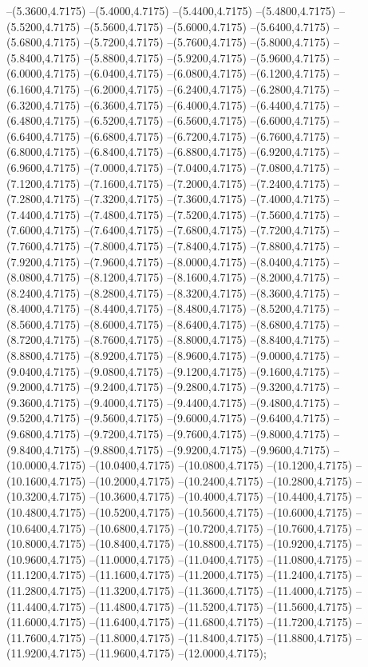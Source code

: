{	--(5.3600,4.7175)
	--(5.4000,4.7175)
	--(5.4400,4.7175)
	--(5.4800,4.7175)
	--(5.5200,4.7175)
	--(5.5600,4.7175)
	--(5.6000,4.7175)
	--(5.6400,4.7175)
	--(5.6800,4.7175)
	--(5.7200,4.7175)
	--(5.7600,4.7175)
	--(5.8000,4.7175)
	--(5.8400,4.7175)
	--(5.8800,4.7175)
	--(5.9200,4.7175)
	--(5.9600,4.7175)
	--(6.0000,4.7175)
	--(6.0400,4.7175)
	--(6.0800,4.7175)
	--(6.1200,4.7175)
	--(6.1600,4.7175)
	--(6.2000,4.7175)
	--(6.2400,4.7175)
	--(6.2800,4.7175)
	--(6.3200,4.7175)
	--(6.3600,4.7175)
	--(6.4000,4.7175)
	--(6.4400,4.7175)
	--(6.4800,4.7175)
	--(6.5200,4.7175)
	--(6.5600,4.7175)
	--(6.6000,4.7175)
	--(6.6400,4.7175)
	--(6.6800,4.7175)
	--(6.7200,4.7175)
	--(6.7600,4.7175)
	--(6.8000,4.7175)
	--(6.8400,4.7175)
	--(6.8800,4.7175)
	--(6.9200,4.7175)
	--(6.9600,4.7175)
	--(7.0000,4.7175)
	--(7.0400,4.7175)
	--(7.0800,4.7175)
	--(7.1200,4.7175)
	--(7.1600,4.7175)
	--(7.2000,4.7175)
	--(7.2400,4.7175)
	--(7.2800,4.7175)
	--(7.3200,4.7175)
	--(7.3600,4.7175)
	--(7.4000,4.7175)
	--(7.4400,4.7175)
	--(7.4800,4.7175)
	--(7.5200,4.7175)
	--(7.5600,4.7175)
	--(7.6000,4.7175)
	--(7.6400,4.7175)
	--(7.6800,4.7175)
	--(7.7200,4.7175)
	--(7.7600,4.7175)
	--(7.8000,4.7175)
	--(7.8400,4.7175)
	--(7.8800,4.7175)
	--(7.9200,4.7175)
	--(7.9600,4.7175)
	--(8.0000,4.7175)
	--(8.0400,4.7175)
	--(8.0800,4.7175)
	--(8.1200,4.7175)
	--(8.1600,4.7175)
	--(8.2000,4.7175)
	--(8.2400,4.7175)
	--(8.2800,4.7175)
	--(8.3200,4.7175)
	--(8.3600,4.7175)
	--(8.4000,4.7175)
	--(8.4400,4.7175)
	--(8.4800,4.7175)
	--(8.5200,4.7175)
	--(8.5600,4.7175)
	--(8.6000,4.7175)
	--(8.6400,4.7175)
	--(8.6800,4.7175)
	--(8.7200,4.7175)
	--(8.7600,4.7175)
	--(8.8000,4.7175)
	--(8.8400,4.7175)
	--(8.8800,4.7175)
	--(8.9200,4.7175)
	--(8.9600,4.7175)
	--(9.0000,4.7175)
	--(9.0400,4.7175)
	--(9.0800,4.7175)
	--(9.1200,4.7175)
	--(9.1600,4.7175)
	--(9.2000,4.7175)
	--(9.2400,4.7175)
	--(9.2800,4.7175)
	--(9.3200,4.7175)
	--(9.3600,4.7175)
	--(9.4000,4.7175)
	--(9.4400,4.7175)
	--(9.4800,4.7175)
	--(9.5200,4.7175)
	--(9.5600,4.7175)
	--(9.6000,4.7175)
	--(9.6400,4.7175)
	--(9.6800,4.7175)
	--(9.7200,4.7175)
	--(9.7600,4.7175)
	--(9.8000,4.7175)
	--(9.8400,4.7175)
	--(9.8800,4.7175)
	--(9.9200,4.7175)
	--(9.9600,4.7175)
	--(10.0000,4.7175)
	--(10.0400,4.7175)
	--(10.0800,4.7175)
	--(10.1200,4.7175)
	--(10.1600,4.7175)
	--(10.2000,4.7175)
	--(10.2400,4.7175)
	--(10.2800,4.7175)
	--(10.3200,4.7175)
	--(10.3600,4.7175)
	--(10.4000,4.7175)
	--(10.4400,4.7175)
	--(10.4800,4.7175)
	--(10.5200,4.7175)
	--(10.5600,4.7175)
	--(10.6000,4.7175)
	--(10.6400,4.7175)
	--(10.6800,4.7175)
	--(10.7200,4.7175)
	--(10.7600,4.7175)
	--(10.8000,4.7175)
	--(10.8400,4.7175)
	--(10.8800,4.7175)
	--(10.9200,4.7175)
	--(10.9600,4.7175)
	--(11.0000,4.7175)
	--(11.0400,4.7175)
	--(11.0800,4.7175)
	--(11.1200,4.7175)
	--(11.1600,4.7175)
	--(11.2000,4.7175)
	--(11.2400,4.7175)
	--(11.2800,4.7175)
	--(11.3200,4.7175)
	--(11.3600,4.7175)
	--(11.4000,4.7175)
	--(11.4400,4.7175)
	--(11.4800,4.7175)
	--(11.5200,4.7175)
	--(11.5600,4.7175)
	--(11.6000,4.7175)
	--(11.6400,4.7175)
	--(11.6800,4.7175)
	--(11.7200,4.7175)
	--(11.7600,4.7175)
	--(11.8000,4.7175)
	--(11.8400,4.7175)
	--(11.8800,4.7175)
	--(11.9200,4.7175)
	--(11.9600,4.7175)
	--(12.0000,4.7175);
}
